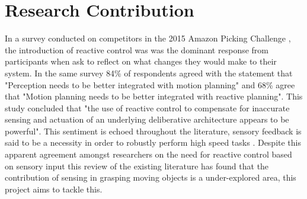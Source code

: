 \section{Research Contribution}
In a survey conducted on competitors in the 2015 Amazon Picking Challenge \cite{APCObservations}, the introduction of reactive control was was the dominant response from participants when ask to reflect on what changes they would make to their system. In the same survey 84\% of respondents agreed with the statement that "Perception needs to be better integrated with motion planning" and 68\% agree that "Motion planning needs to be better integrated with reactive planning". This study concluded that "the use of reactive control to compensate for inaccurate sensing and actuation of an underlying deliberative architecture appears to be powerful". This sentiment is echoed throughout the literature, sensory feedback is said to be a necessity in order to robustly perform high speed tasks \cite{Senoo2006}. Despite this apparent agreement amongst researchers on the need for reactive control based on sensory input this review of the existing literature has found that the contribution of sensing in grasping moving objects is a under-explored area, this project aims to tackle this.




